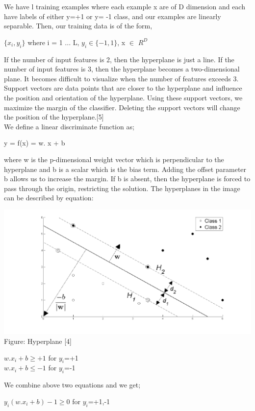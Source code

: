 \documentclass[hidelinks,12pt]{article}
\begin{document}
	We have l training examples where each example x are of D dimension and each have labels of either y=+1 or y= -1 class, and our examples are linearly separable. Then, our training data is of the form,
	\begin{center}
	    $\{x_i,y_i\}$ where i = 1 ... L, $y_i \in \{-1,1\}$, x $\in$ $R^D$ 
	\end{center}

	If the number of input features is 2, then the hyperplane is just a line. If the number of input features is 3, then the hyperplane becomes a two-dimensional plane. It becomes difficult to visualize when the number of features exceeds 3.
	Support vectors are data points that are closer to the hyperplane and influence the position and orientation of the hyperplane. Using these support vectors, we maximize the margin of the classifier. Deleting the support vectors will change the position of the hyperplane.[5]
	\\

	We define a linear discriminate function as;
	\begin{center}
	y = f(x) = w. x + b     
	\end{center}
	where w is the p-dimensional weight vector which is perpendicular to the hyperplane and b is a scalar which is the bias term.  Adding the offset parameter b allows us to increase the margin. If b is absent, then
	the hyperplane is forced to pass through the origin, restricting the solution. 
	The hyperplanes in the image can be described by equation: 
	\begin{center}
	    \includegraphics[scale = 0.7]{images/svm.png}
	    Figure: Hyperplane [4]
	\end{center}
	\begin{center}
	$w.x_i + b \geq +1$  for $y_i$=+1\\
	$w.x_i + b \leq -1 $ for $y_i$=-1    
	\end{center}
	We combine above two equations and we get;
	\begin{center}
	$y_i(w.x_i + b)-1 \geq 0$  for $y_i$=+1,-1\\
	\end{center}
\end{document}
